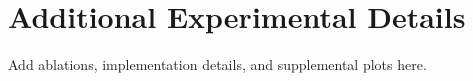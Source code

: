 \appendix
\section{Additional Experimental Details}
Add ablations, implementation details, and supplemental plots here.
